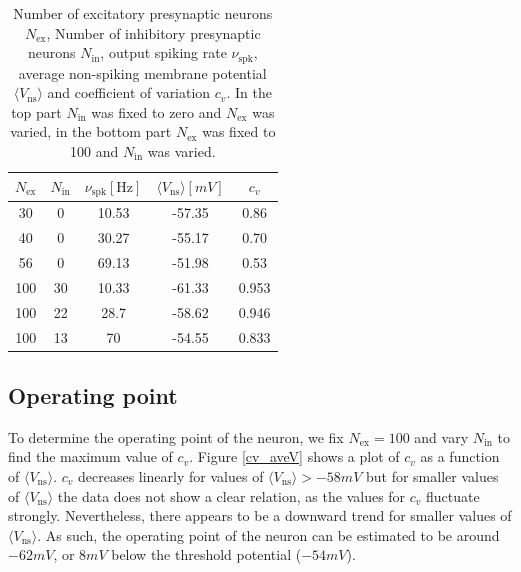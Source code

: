 \documentclass{scrartcl}
\begin{document}
\begin{table}
\centering
\begin{tabular}{c c c c c}
$N_\mathrm{ex}$ & $N_\mathrm{in}$ & $\nu_\mathrm{spk} [\si{\hertz}]$ &$\langle V_\mathrm{ns}\rangle [\si{mV}]$ & $c_v$ \\ \hline \hline
30 & 0 & 10.53 & -57.35 & 0.86\\
40 & 0 & 30.27 & -55.17 & 0.70\\
56 & 0 & 69.13 & -51.98 & 0.53\\ \hline
100 & 30 & 10.33 & -61.33& 0.953\\
100 & 22 & 28.7 & -58.62& 0.946\\
100 & 13 & 70 & -54.55& 0.833\\
\end{tabular}
\caption{Number of excitatory presynaptic neurons $N_\mathrm{ex}$, Number of inhibitory presynaptic neurons $N_\mathrm{in}$, output spiking rate $\nu_\mathrm{spk}$, average non-spiking membrane potential $\langle V_\mathrm{ns}\rangle$ and coefficient of variation $c_v$. In the top part $N_\mathrm{in}$ was fixed to zero and $N_\mathrm{ex}$ was varied, in the bottom part $N_\mathrm{ex}$ was fixed to 100 and $N_\mathrm{in}$ was varied.}
\label{rates}
\end{table}

\subsection*{Operating point}

To determine the operating point of the neuron, we fix $N_\mathrm{ex}=100$ and vary $N_\mathrm{in}$ to find the maximum value of $c_v$. Figure \ref{cv_aveV} shows a plot of $c_v$ as a function of $\langle V_\mathrm{ns}\rangle$. $c_v$ decreases linearly for values of $\langle V_\mathrm{ns}\rangle > -58\si{mV}$ but for smaller values of $\langle V_\mathrm{ns}\rangle$ the data does not show a clear relation, as the values for $c_v$ fluctuate strongly. Nevertheless, there appears to be a downward trend for smaller values of $\langle V_\mathrm{ns}\rangle$. As such, the operating point of the neuron can be estimated to be around $-62\si{mV}$, or $8\si{mV}$ below the threshold potential ($-54\si{mV}$).
\end{document}
